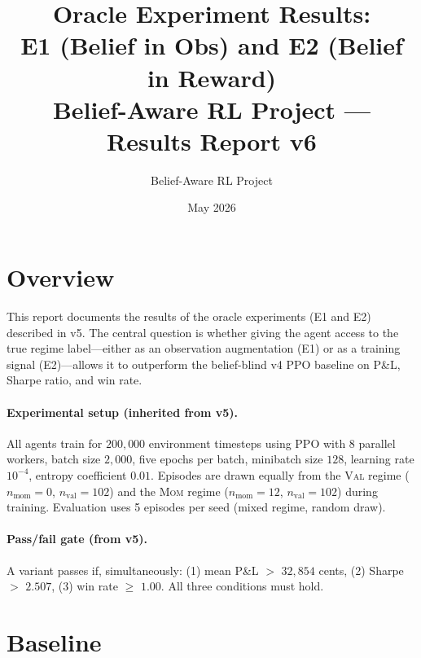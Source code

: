 \documentclass[11pt]{article}
\title{Oracle Experiment Results:\\
       E1 (Belief in Obs) and E2 (Belief in Reward)\\[0.4em]
       \large Belief-Aware RL Project --- Results Report v6}
\author{Belief-Aware RL Project}
\date{May 2026}
\begin{document}
\maketitle
\tableofcontents
\bigskip

\section{Overview}

This report documents the results of the oracle experiments (E1 and E2)
described in v5.
The central question is whether giving the agent access to the true regime
label---either as an observation augmentation (E1) or as a training signal
(E2)---allows it to outperform the belief-blind v4 PPO baseline on P\&L,
Sharpe ratio, and win rate.

\paragraph{Experimental setup (inherited from v5).}
All agents train for $200{,}000$ environment timesteps using PPO with
8 parallel workers, batch size $2{,}000$, five epochs per batch, minibatch
size $128$, learning rate $10^{-4}$, entropy coefficient $0.01$.
Episodes are drawn equally from the \textsc{Val} regime
($n_\text{mom}=0$, $n_\text{val}=102$) and the \textsc{Mom} regime
($n_\text{mom}=12$, $n_\text{val}=102$) during training.
Evaluation uses 5 episodes per seed (mixed regime, random draw).

\paragraph{Pass/fail gate (from v5).}
A variant passes if, simultaneously:
(1) mean P\&L $>$ $32{,}854$ cents,
(2) Sharpe $>$ $2.507$,
(3) win rate $\geq$ $1.00$.
All three conditions must hold.

\section{Baseline}
\end{document}
